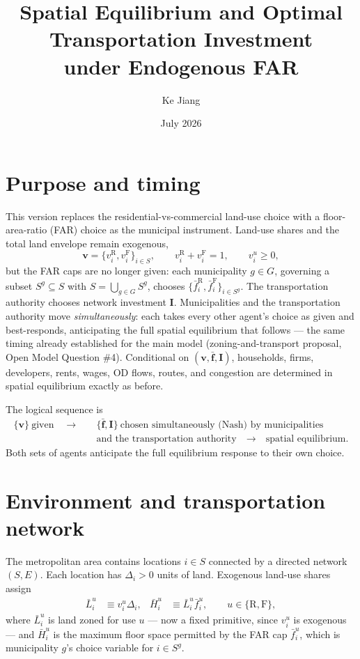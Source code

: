 \documentclass[12pt,a4paper]{article}
\title{Spatial Equilibrium and Optimal Transportation Investment\\under Endogenous FAR}
\author{Ke Jiang}
\date{July 2026}
\newcommand{\R}{\mathrm{R}}
\newcommand{\F}{\mathrm{F}}
\newcommand{\1}{\mathbb 1}
\begin{document}
\maketitle

\section{Purpose and timing}

This version replaces the residential-vs-commercial land-use choice with a floor-area-ratio (FAR) choice as the municipal instrument. Land-use shares and the total land envelope remain exogenous,
\[
\mathbf v=\{v_i^{\R},v_i^{\F}\}_{i\in S},
\qquad
v_i^{\R}+v_i^{\F}=1,
\qquad
v_i^u\geq0,
\]
but the FAR caps are no longer given: each municipality $g\in G$, governing a subset $S^g\subseteq S$ with $S=\bigcup_{g\in G}S^g$, chooses $\{\bar f_i^{\R},\bar f_i^{\F}\}_{i\in S^g}$. The transportation authority chooses network investment $\mathbf I$. Municipalities and the transportation authority move \emph{simultaneously}: each takes every other agent's choice as given and best-responds, anticipating the full spatial equilibrium that follows — the same timing already established for the main model (zoning-and-transport proposal, Open Model Question \#4). Conditional on $(\mathbf v,\bar{\mathbf f},\mathbf I)$, households, firms, developers, rents, wages, OD flows, routes, and congestion are determined in spatial equilibrium exactly as before.

The logical sequence is
\begin{align*}
\{\mathbf v\}\ \text{given}
\quad\longrightarrow\quad
&\{\bar{\mathbf f},\mathbf I\}\ \text{chosen simultaneously (Nash) by municipalities}\\
&\text{and the transportation authority}
\quad\longrightarrow\quad
\text{spatial equilibrium.}
\end{align*}
Both sets of agents anticipate the full equilibrium response to their own choice.

\section{Environment and transportation network}

The metropolitan area contains locations $i\in S$ connected by a directed network $(S,E)$. Each location has $\Delta_i>0$ units of land. Exogenous land-use shares assign
\begin{align}
\bar L_i^u&\equiv v_i^u\Delta_i,
&
\bar H_i^u&\equiv \bar L_i^u\bar f_i^u,
\qquad u\in\{\R,\F\},
\label{eq:zoning-primitives}
\end{align}
where $\bar L_i^u$ is land zoned for use $u$ — now a fixed primitive, since $v_i^u$ is exogenous — and $\bar H_i^u$ is the maximum floor space permitted by the FAR cap $\bar f_i^u$, which is municipality $g$'s choice variable for $i\in S^g$.
\end{document}
